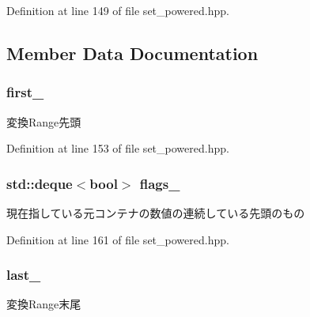 \-Definition at line 149 of file set\-\_\-powered.\-hpp.



\subsection{\-Member \-Data \-Documentation}
\hypertarget{classyuh_1_1range__detail_1_1set__power__iterator_a9296ec46eb2f6c43cf6c5263aaf54cca}{
\subsubsection[{first\-\_\-}]{ {\bf first\-\_\-}}}\label{db/d16/classyuh_1_1range__detail_1_1set__power__iterator_a9296ec46eb2f6c43cf6c5263aaf54cca}
変換\-Range先頭 

\-Definition at line 153 of file set\-\_\-powered.\-hpp.

\hypertarget{classyuh_1_1range__detail_1_1set__power__iterator_a54539438ea4c794db488afe8afa24452}{
\subsubsection[{flags\-\_\-}]{\setlength{\rightskip}{0pt plus 5cm}std\-::deque$<$bool$>$ {\bf flags\-\_\-}}}\label{db/d16/classyuh_1_1range__detail_1_1set__power__iterator_a54539438ea4c794db488afe8afa24452}
現在指している元コンテナの数値の連続している先頭のもの 

\-Definition at line 161 of file set\-\_\-powered.\-hpp.

\hypertarget{classyuh_1_1range__detail_1_1set__power__iterator_a9d115442fe366e570c20b178cc577690}{
\subsubsection[{last\-\_\-}]{ {\bf last\-\_\-}}}\label{db/d16/classyuh_1_1range__detail_1_1set__power__iterator_a9d115442fe366e570c20b178cc577690}
変換\-Range末尾 

